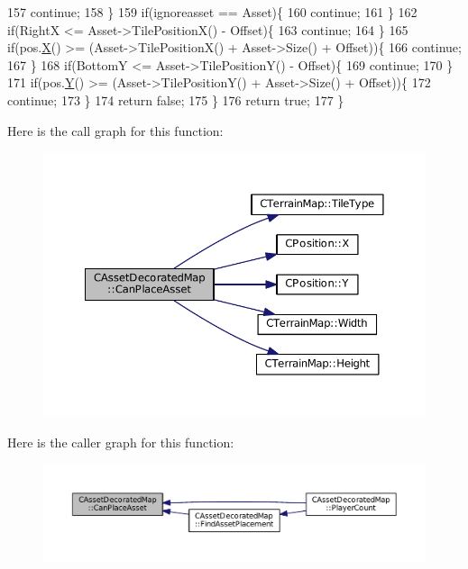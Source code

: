 \begin{DoxyCode}
157             \textcolor{keywordflow}{continue};    
158         \}
159         \textcolor{keywordflow}{if}(ignoreasset == Asset)\{
160             \textcolor{keywordflow}{continue};   
161         \}
162         \textcolor{keywordflow}{if}(RightX <= Asset->TilePositionX() - Offset)\{
163             \textcolor{keywordflow}{continue};   
164         \}
165         \textcolor{keywordflow}{if}(pos.\hyperlink{classCPosition_a9a6b94d3b91df1492d166d9964c865fc}{X}() >= (Asset->TilePositionX() + Asset->Size() + Offset))\{
166             \textcolor{keywordflow}{continue};   
167         \}
168         \textcolor{keywordflow}{if}(BottomY <= Asset->TilePositionY() - Offset)\{
169             \textcolor{keywordflow}{continue};   
170         \}
171         \textcolor{keywordflow}{if}(pos.\hyperlink{classCPosition_a1aa8a30e2f08dda1f797736ba8c13a87}{Y}() >= (Asset->TilePositionY() + Asset->Size() + Offset))\{
172             \textcolor{keywordflow}{continue};   
173         \}
174         \textcolor{keywordflow}{return} \textcolor{keyword}{false};
175     \}
176     \textcolor{keywordflow}{return} \textcolor{keyword}{true};
177 \}
\end{DoxyCode}
Here is the call graph for this function\+:
\nopagebreak
\begin{figure}[H]
\begin{center}
\leavevmode
\includegraphics[width=350pt]{classCAssetDecoratedMap_ad4baef4b84b066847459e45205c8575c_cgraph}
\end{center}
\end{figure}
Here is the caller graph for this function\+:
\nopagebreak
\begin{figure}[H]
\begin{center}
\leavevmode
\includegraphics[width=350pt]{classCAssetDecoratedMap_ad4baef4b84b066847459e45205c8575c_icgraph}
\end{center}
\end{figure}
